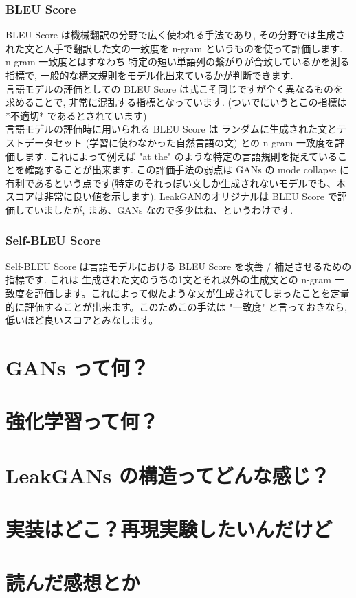 \documentclass[a4paper, dvipdfmx, 10pt]{article}
\begin{document}
\subsubsection{BLEU Score}
\label{sec:orgbe61fd0}
BLEU Score は機械翻訳の分野で広く使われる手法であり, その分野では生成された文と人手で翻訳した文の一致度を n-gram というものを使って評価します. n-gram 一致度とはすなわち 特定の短い単語列の繋がりが合致しているかを測る指標で, 一般的な構文規則をモデル化出来ているかが判断できます.\\
言語モデルの評価としての BLEU Score は式こそ同じですが全く異なるものを求めることで, 非常に混乱する指標となっています. (ついでにいうとこの指標は　*不適切* であるとされています)\\
言語モデルの評価時に用いられる BLEU Score は ランダムに生成された文とテストデータセット (学習に使わなかった自然言語の文) との n-gram 一致度を評価します. これによって例えば "at the" のような特定の言語規則を捉えていることを確認することが出来ます. この評価手法の弱点は GANs  の mode collapse に有利であるという点です(特定のそれっぽい文しか生成されないモデルでも、本スコアは非常に良い値を示します). LeakGANのオリジナルは BLEU Score で評価していましたが, まあ、GANs なので多少はね、というわけです.
\subsubsection{Self-BLEU Score}
\label{sec:org36252a6}
Self-BLEU Score は言語モデルにおける BLEU Score を改善 / 補足させるための指標です. これは 生成された文のうちの1文とそれ以外の生成文との n-gram 一致度を評価します。これによって似たような文が生成されてしまったことを定量的に評価することが出来ます。このためこの手法は "一致度" と言っておきなら, 低いほど良いスコアとみなします。
\section{GANs って何？}
\label{sec:org62edd51}
\section{強化学習って何？}
\label{sec:org4bc3a44}
\section{LeakGANs の構造ってどんな感じ？}
\label{sec:org0f18131}
\section{実装はどこ？再現実験したいんだけど}
\label{sec:org38cfcf8}
\section{読んだ感想とか}
\label{sec:org2ad0298}
\end{document}
